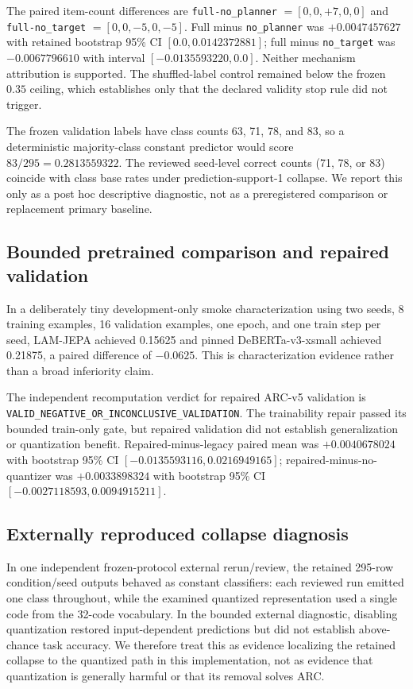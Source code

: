 \documentclass[twoside]{article}
\begin{document}
The paired item-count differences are \texttt{full-no\_planner} $=[0,0,+7,0,0]$ and \texttt{full-no\_target} $=[0,0,-5,0,-5]$. Full minus \texttt{no\_planner} was $+0.0047457627$ with retained bootstrap 95\% CI $[0.0, 0.0142372881]$; full minus \texttt{no\_target} was $-0.0067796610$ with interval $[-0.0135593220,0.0]$. Neither mechanism attribution is supported. The shuffled-label control remained below the frozen $0.35$ ceiling, which establishes only that the declared validity stop rule did not trigger.

The frozen validation labels have class counts 63, 71, 78, and 83, so a deterministic majority-class constant predictor would score $83/295=0.2813559322$. The reviewed seed-level correct counts (71, 78, or 83) coincide with class base rates under prediction-support-1 collapse. We report this only as a post hoc descriptive diagnostic, not as a preregistered comparison or replacement primary baseline.

\subsection{Bounded pretrained comparison and repaired validation}
In a deliberately tiny development-only smoke characterization using two seeds, 8 training examples, 16 validation examples, one epoch, and one train step per seed, LAM-JEPA achieved 0.15625 and pinned DeBERTa-v3-xsmall achieved 0.21875, a paired difference of $-0.0625$. This is characterization evidence rather than a broad inferiority claim.

The independent recomputation verdict for repaired ARC-v5 validation is \texttt{VALID\_NEGATIVE\_OR\_INCONCLUSIVE\_VALIDATION}. The trainability repair passed its bounded train-only gate, but repaired validation did not establish generalization or quantization benefit. Repaired-minus-legacy paired mean was $+0.0040678024$ with bootstrap 95\% CI $[-0.0135593116,0.0216949165]$; repaired-minus-no-quantizer was $+0.0033898324$ with bootstrap 95\% CI $[-0.0027118593,0.0094915211]$.

\subsection{Externally reproduced collapse diagnosis}
In one independent frozen-protocol external rerun/review, the retained 295-row condition/seed outputs behaved as constant classifiers: each reviewed run emitted one class throughout, while the examined quantized representation used a single code from the 32-code vocabulary. In the bounded external diagnostic, disabling quantization restored input-dependent predictions but did not establish above-chance task accuracy. We therefore treat this as evidence localizing the retained collapse to the quantized path in this implementation, not as evidence that quantization is generally harmful or that its removal solves ARC.
\end{document}
